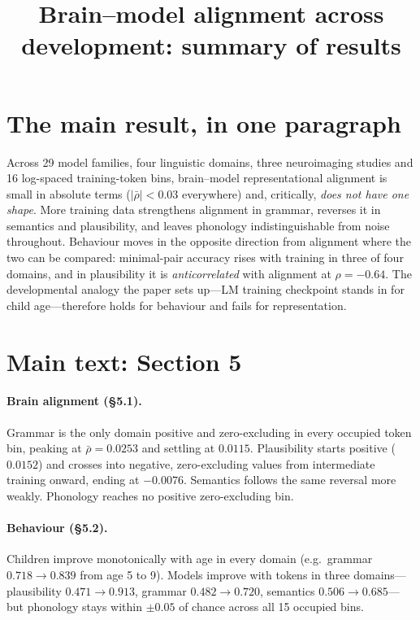 \documentclass[11pt]{article}
\title{Brain--model alignment across development: summary of results}
\author{}
\date{}
\begin{document}
\maketitle

\section{The main result, in one paragraph}

Across 29 model families, four linguistic domains, three neuroimaging studies
and 16 log-spaced training-token bins, brain--model representational alignment
is small in absolute terms ($|\bar\rho| < 0.03$ everywhere) and, critically,
\emph{does not have one shape}. More training data strengthens alignment in
grammar, reverses it in semantics and plausibility, and leaves phonology
indistinguishable from noise throughout. Behaviour moves in the opposite
direction from alignment where the two can be compared: minimal-pair accuracy
rises with training in three of four domains, and in plausibility it is
\emph{anticorrelated} with alignment at $\rho = -0.64$. The developmental
analogy the paper sets up---LM training checkpoint stands in for child
age---therefore holds for behaviour and fails for representation.

\section{Main text: Section 5}

\paragraph{Brain alignment (\S5.1).} Grammar is the only domain positive and
zero-excluding in every occupied token bin, peaking at $\bar\rho = 0.0253$ and
settling at $0.0115$. Plausibility starts positive ($0.0152$) and crosses into
negative, zero-excluding values from intermediate training onward, ending at
$-0.0076$. Semantics follows the same reversal more weakly. Phonology reaches
no positive zero-excluding bin.

\paragraph{Behaviour (\S5.2).} Children improve monotonically with age in
every domain (e.g.\ grammar $0.718 \to 0.839$ from age 5 to 9). Models improve
with tokens in three domains---plausibility $0.471 \to 0.913$, grammar
$0.482 \to 0.720$, semantics $0.506 \to 0.685$---but phonology stays within
$\pm 0.05$ of chance across all 15 occupied bins.
\end{document}
